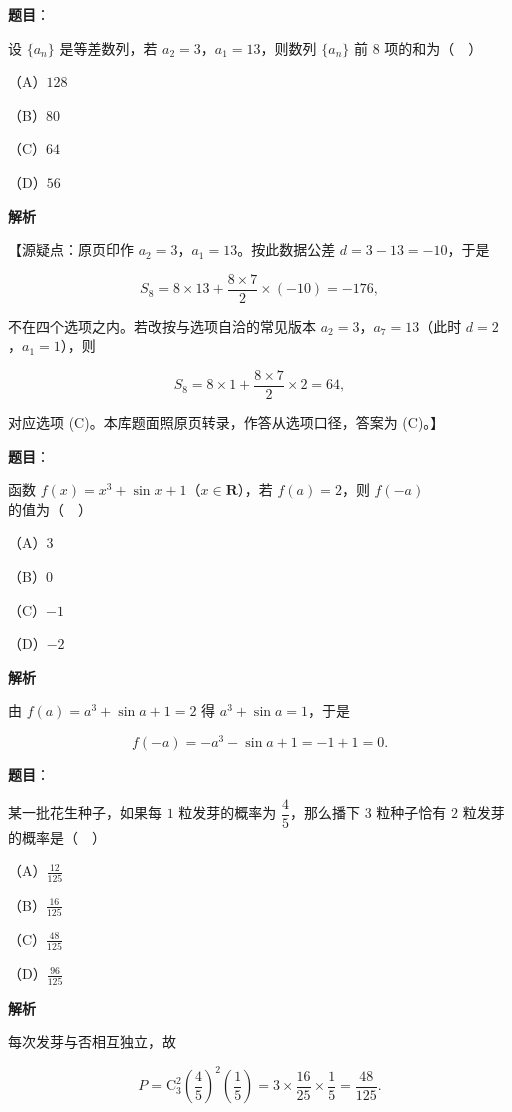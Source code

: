 \begin{answer}

\textbf{题目}：

设 $\{a_n\}$ 是等差数列，若 $a_2=3$，$a_1=13$，则数列 $\{a_n\}$ 前 $8$ 项的和为（　）

（A）$128$

（B）$80$

（C）$64$

（D）$56$

\textbf{解析}

【源疑点：原页印作 $a_2=3$，$a_1=13$。按此数据公差 $d=3-13=-10$，于是

\nopagebreak[4]
\[S_8=8\times13+\frac{8\times7}2\times(-10)=-176,\]

不在四个选项之内。若改按与选项自洽的常见版本 $a_2=3$，$a_7=13$（此时 $d=2$，$a_1=1$），则

\nopagebreak[4]
\[S_8=8\times1+\frac{8\times7}2\times2=64,\]

对应选项 (C)。本库题面照原页转录，作答从选项口径，答案为 (C)。】


\end{answer}
\begin{answer}

\textbf{题目}：

函数 $f(x)=x^3+\sin x+1$（$x\in\mathbf R$），若 $f(a)=2$，则 $f(-a)$ 的值为（　）

（A）$3$

（B）$0$

（C）$-1$

（D）$-2$

\textbf{解析}

由 $f(a)=a^3+\sin a+1=2$ 得 $a^3+\sin a=1$，于是

\nopagebreak[4]
\[f(-a)=-a^3-\sin a+1=-1+1=0.\]


\end{answer}
\begin{answer}

\textbf{题目}：

某一批花生种子，如果每 $1$ 粒发芽的概率为 $\dfrac45$，那么播下 $3$ 粒种子恰有 $2$ 粒发芽的概率是（　）

（A）$\frac{12}{125}$

（B）$\frac{16}{125}$

（C）$\frac{48}{125}$

（D）$\frac{96}{125}$

\textbf{解析}

每次发芽与否相互独立，故

\nopagebreak[4]
\[P=\mathrm C_3^2\left(\frac45\right)^2\left(\frac15\right)=3\times\frac{16}{25}\times\frac15=\frac{48}{125}.\]


\end{answer}
